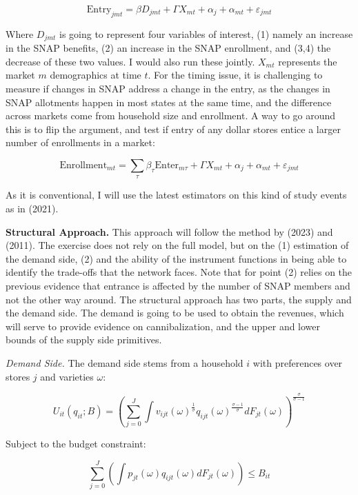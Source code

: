 \documentclass[11pt]{article}
\begin{document}
\[\text{Entry}_{jmt} =  \beta D_{jmt} +  \Gamma X_{mt} + \alpha_{j} + \alpha_{mt} + \varepsilon_{jmt}\]

Where $D_{jmt}$ is going to represent four variables of interest, (1) namely an increase in the SNAP benefits, (2) an increase in the SNAP enrollment, and (3,4) the decrease of these two values. I would also run these jointly. $X_{mt}$ represents the market $m$ demographics at time $t$. For the timing issue, it is challenging to measure if changes in SNAP address a change in the entry, as the changes in SNAP allotments happen in most states at the same time, and the difference across markets come from household size and enrollment. A way to go around this is to flip the argument, and test if entry of any dollar stores entice a larger number of enrollments in a market:


\[\text{Enrollment}_{mt} =  \sum_{\tau} \beta_{\tau}  \text{Enter}_{m\tau} +  \Gamma X_{mt} + \alpha_{j} + \alpha_{mt} + \varepsilon_{jmt}\]


As it is conventional, I will use the latest estimators on this kind of study events as in \citeauthor{callaway2021difference} (2021). 

\textbf{Structural Approach.} This approach will follow the method by \citeauthor{houde2023nexus} (2023) and \citeauthor{holmes2011diffusion} (2011). The exercise does not rely on the full model, but on the (1) estimation of the demand side, (2) and the ability of the instrument functions in being able to identify the trade-offs that the network faces. Note that for point (2) relies on the previous evidence that entrance is affected by the number of SNAP members and not the other way around. The structural approach has two parts, the supply and the demand side. The demand is going to be used to obtain the revenues, which will serve to provide evidence on cannibalization, and the upper and lower bounds of the supply side primitives. 

\textit{Demand Side.} The demand side stems from a household $i$ with preferences over stores $j$ and varieties $\omega$: 

\[U_{it}(q_{it};B) =  \left(\sum_{j=0}^J \int v_{ijt}(\omega)^{\frac{1}{\sigma}} q_{ijt}(\omega)^{\frac{\sigma - 1}{\sigma}} dF_{jt}(\omega) \right)^{\frac{\sigma}{\sigma - 1}}\]

Subject to the budget constraint:


\[\sum_{j=0}^J \left( \int p_{jt}(\omega) q_{ijt}(\omega) dF_{jt}(\omega) \right) \leq B_{it}\]
\end{document}
